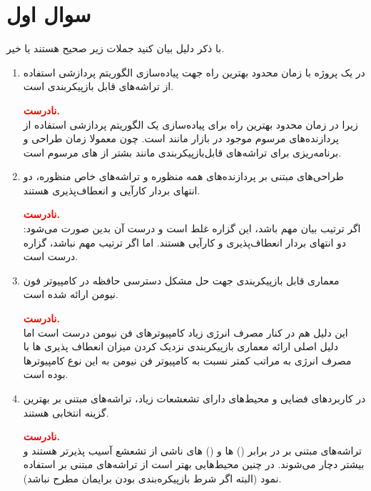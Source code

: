 \section{سوال اول}

با ذکر دلیل بیان کنید جملات زیر صحیح هستند یا خیر.

\begin{enumerate}
	\item 
	در یک پروژه با زمان محدود بهترین راه جهت پیاده‌سازی الگوریتم پردازشی استفاده از تراشه‌های قابل بازپیکربندی است.
	\begin{qsolve}
		\textbf{\textcolor{red}{نادرست.}}\\
		زیرا در زمان محدود بهترین راه برای پیاده‌سازی یک الگوریتم پردازشی استفاده از پردازنده‌های مرسوم موجود در بازار مانند  است. چون معمولا زمان طراحی و برنامه‌ریزی برای تراشه‌های قابل‌بازپیکربندی مانند  بشتر از  های مرسوم است.
	\end{qsolve}
	
	
	
	\item 
	طراحی‌های مبتنی بر پردازنده‌های همه منظوره و تراشه‌های خاص منظوره، دو انتهای بردار کارآیی و انعطاف‌پذیری هستند.
	\begin{qsolve}
		\textbf{\textcolor{red}{نادرست.}}\\
		اگر ترتیب بیان مهم باشد، این گزاره غلط است و درست آن بدین صورت می‌شود:‌ دو انتهای بردار انعطاف‌پذیری و کارآیی هستند. اما اگر ترتیب مهم نباشد، گزاره درست است.
	\end{qsolve}
	
	
	
	\item 
	معماری قابل بازپیکربندی جهت حل مشکل دسترسی حافظه در کامپیوتر فون نیومن ارائه شده است.
	\begin{qsolve}
		\textbf{\textcolor{red}{نادرست.}}\\
		این دلیل هم در کنار مصرف انرژی زیاد کامپیوتر‌های فن نیومن درست است اما دلیل اصلی ارائه معماری بازپیکربندی نزدیک کردن میزان انعطاف پذیری  ها با مصرف انرژی به مراتب کمتر نسبت به کامپیوتر فن نیومن به این نوع کامپیوترها بوده است.
	\end{qsolve}
	
	
	
	\item 
	در کاربردهای فضایی و محیط‌های دارای تشعشعات زیاد، تراشه‌های مبتنی بر  بهترین گزینه انتخابی هستند.
	\begin{qsolve}
		\textbf{\textcolor{red}{نادرست.}}\\
		تراشه‌های مبتنی بر  در برابر () ها و () های ناشی از تشعشع آسیب پذیرتر هستند و بیشتر دچار  می‌شوند. در چنین محیط‌هایی بهتر است از تراشه‌های مبتنی بر  استفاده نمود (البته اگر شرط بازپیکره‌بندی بودن برایمان مطرح نباشد). 
		

\end{qsolve}
\end{enumerate}
